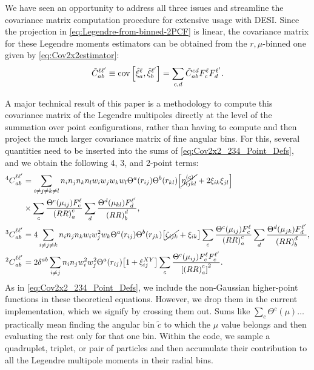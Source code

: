We have seen an opportunity to address all three issues and streamline the covariance matrix computation procedure for extensive usage with DESI.
Since the projection in \cref{eq:Legendre-from-binned-2PCF} is linear, the covariance matrix for these Legendre moments estimators can be obtained from the $r,\mu$-binned one given by \cref{eq:Cov2x2estimator}:
\begin{equation} \label{eq:full-cov-projection-Legendre}
    \tilde C_{ab}^{\ell\ell'} \equiv \operatorname{cov} \qty[\hat \xi^\ell_a, \hat \xi^{\ell'}_b] = \sum_{c,d} \tilde C_{ab}^{cd} F^\ell_c F^{\ell'}_d.
\end{equation}

A major technical result of this paper is a methodology to compute this covariance matrix of the Legendre multipoles directly at the level of the summation over point configurations, rather than having to compute and then project the much larger covariance matrix of fine angular bins.
For this, several quantities need to be inserted into the sums of \cref{eq:Cov2x2_234_Point_Defs}, and we obtain the following 4, 3, and 2-point terms:
\begin{align} \label{eq:Cov2x2_234_Point_Defs_Legendre_Projected}
{^4C}_{ab}^{\ell\ell'} &= \sum_{i\neq j\neq k\neq l} n_i n_j n_k n_l w_i w_j w_k w_l \Theta^a(r_{ij}) \Theta^b(r_{kl}) \qty[\cancel{\eta^{({\rm c})}_{ijkl}} + 2\xi_{ik} \xi_{jl}] \\ \nonumber
& \times \sum_c \frac{\Theta^c(\mu_{ij}) F^\ell_c}{\qty(RR)_a^c} \sum_d \frac{\Theta^d(\mu_{kl}) F^{\ell'}_d}{\qty(RR)_b^d}, \\ \nonumber
{^3C}_{ab}^{\ell\ell'} &= 4 \sum_{i\neq j\neq k} n_i n_j n_k w_i w_j^2 w_k \Theta^a(r_{ij}) \Theta^b(r_{jk}) \qty[\cancel{\zeta_{ijk}} + \xi_{ik}] \sum_c \frac{\Theta^c(\mu_{ij}) F^\ell_c}{\qty(RR)_a^c} \sum_d \frac{\Theta^d(\mu_{jk}) F^{\ell'}_d}{\qty(RR)_b^d}, \\ \nonumber
{^2C}_{ab}^{\ell\ell'} &= 2\delta^{ab} \sum_{i\neq j} n_i n_j w_i^2 w_j^2 \Theta^a(r_{ij}) \qty[1+\xi^{XY}_{ij}] \sum_c \frac{\Theta^c(\mu_{ij}) F^\ell_c F^{\ell'}_c}{\qty[\qty(RR)_a^c]^2}.
\end{align}
As in \cref{eq:Cov2x2_234_Point_Defs}, we include the non-Gaussian higher-point functions in these theoretical equations.
However, we drop them in the current implementation, which we signify by crossing them out.
Sums like $\sum_c \Theta^c(\mu) \dots$ practically mean finding the angular bin $\tilde c$ to which the $\mu$ value belongs and then evaluating the rest only for that one bin.
Within the code, we sample a quadruplet, triplet, or pair of particles and then accumulate their contribution to all the Legendre multipole moments in their radial bins.


